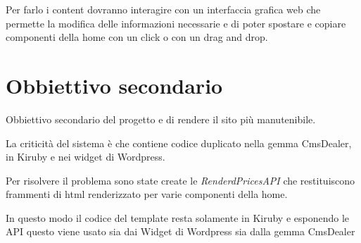Per farlo i content dovranno interagire con un interfaccia grafica web che permette
la modifica delle informazioni necessarie e di poter spostare e copiare
componenti della home con un click o con un drag and drop.

\section{Obbiettivo secondario}
Obbiettivo secondario del progetto e di rendere il sito più manutenibile.

La criticità del sistema è che contiene codice duplicato nella gemma CmsDealer, in Kiruby
e nei widget di Wordpress. 

Per risolvere il problema sono state create le  \emph{RenderdPricesAPI} 
che restituiscono frammenti di html renderizzato per varie componenti della home.

In questo modo il codice del template resta solamente in Kiruby e esponendo le 
API questo viene usato sia dai Widget di Wordpress sia dalla gemma CmsDealer

